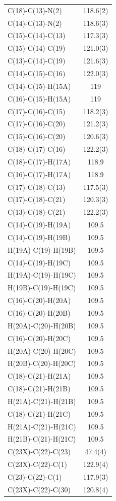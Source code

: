 \begin{center}
{\begin{supertabular}{p{1.5in}c}
C(18)-C(13)-N(2)&118.6(2)\\
C(14)-C(13)-N(2)&118.6(3)\\
C(15)-C(14)-C(13)&117.3(3)\\
C(15)-C(14)-C(19)&121.0(3)\\
C(13)-C(14)-C(19)&121.6(3)\\
C(14)-C(15)-C(16)&122.0(3)\\
C(14)-C(15)-H(15A)&119\\
C(16)-C(15)-H(15A)&119\\
C(17)-C(16)-C(15)&118.2(3)\\
C(17)-C(16)-C(20)&121.2(3)\\
C(15)-C(16)-C(20)&120.6(3)\\
C(18)-C(17)-C(16)&122.2(3)\\
C(18)-C(17)-H(17A)&118.9\\
C(16)-C(17)-H(17A)&118.9\\
C(17)-C(18)-C(13)&117.5(3)\\
C(17)-C(18)-C(21)&120.3(3)\\
C(13)-C(18)-C(21)&122.2(3)\\
C(14)-C(19)-H(19A)&109.5\\
C(14)-C(19)-H(19B)&109.5\\
H(19A)-C(19)-H(19B)&109.5\\
C(14)-C(19)-H(19C)&109.5\\
H(19A)-C(19)-H(19C)&109.5\\
H(19B)-C(19)-H(19C)&109.5\\
C(16)-C(20)-H(20A)&109.5\\
C(16)-C(20)-H(20B)&109.5\\
H(20A)-C(20)-H(20B)&109.5\\
C(16)-C(20)-H(20C)&109.5\\
H(20A)-C(20)-H(20C)&109.5\\
H(20B)-C(20)-H(20C)&109.5\\
C(18)-C(21)-H(21A)&109.5\\
C(18)-C(21)-H(21B)&109.5\\
H(21A)-C(21)-H(21B)&109.5\\
C(18)-C(21)-H(21C)&109.5\\
H(21A)-C(21)-H(21C)&109.5\\
H(21B)-C(21)-H(21C)&109.5\\
C(23X)-C(22)-C(23)&47.4(4)\\
C(23X)-C(22)-C(1)&122.9(4)\\
C(23)-C(22)-C(1)&117.9(3)\\
C(23X)-C(22)-C(30)&120.8(4)\\

\end{supertabular}}
\end{center}
